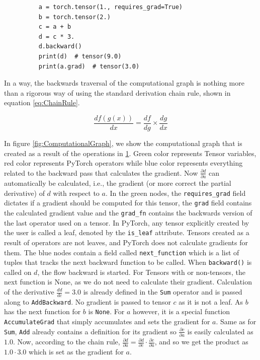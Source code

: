 \begin{figure}[h]
    \centering
    \begin{verbatim}
    a = torch.tensor(1., requires_grad=True)
    b = torch.tensor(2.)
    c = a + b
    d = c * 3.
    d.backward()
    print(d)  # tensor(9.0)
    print(a.grad)  # tensor(3.0)
    \end{verbatim}
    \caption{}
    \label{fig:CodeComputationalGraph}
\end{figure}

In a way, the backwards traversal of the computational graph is nothing more than a rigorous way of using the standard derivation chain rule, shown in equation \ref{eq:ChainRule}.

\begin{equation}\label{eq:ChainRule}
    \frac{d f(g(x))}{dx} = \frac{d f}{dg} \times \frac{d g}{d x}
\end{equation}

In figure \ref{fig:ComputationalGraph}, we show the computational graph that is created as a result of the operations in \ref{fig:CodeComputationalGraph}. Green color represents Tensor variables, red color represents PyTorch operators while blue color represents everything related to the backward pass that calculates the gradient. Now $\frac{\partial d}{\partial a}$ can automatically be calculated, i.e., the gradient (or more correct the partial derivative) of $d$ with respect to $a$. In the green nodes, the \texttt{requires\_grad} field dictates if a gradient should be computed for this tensor, the \texttt{grad} field contains the calculated gradient value and the \texttt{grad\_fn} contains the backwards version of the last operator used on a tensor. In PyTorch, any tensor explicitly created by the user is called a leaf, denoted by the \texttt{is\_leaf} attribute. Tensors created as a result of operators are not leaves, and PyTorch does not calculate gradients for them. The blue nodes contain a field called \texttt{next\_function} which is a list of tuples that tracks the next backward function to be called. When \texttt{backward()} is called on $d$, the flow backward is started. For Tensors with  or non-tensors, the next function is None, as we do not need to calculate their gradient. Calculation of the derivative $\frac{d d}{d c} = 3.0$ is already defined in the \texttt{Sum} operator and is passed along to \texttt{AddBackward}. No gradient is passed to tensor $c$ as it is not a leaf. As $b$ has  the next function for $b$ is \texttt{None}. For $a$ however, it is a special function \texttt{AccumulateGrad} that simply accumulates and sets the gradient for $a$. Same as for \texttt{Sum}, \texttt{Add} already contains a definition for its gradient so $\frac{\partial c}{\partial a}$ is easily calculated as $1.0$. Now, according to the chain rule, $\frac{\partial d}{\partial a} = \frac{\partial d}{\partial c} \cdot \frac{\partial c}{\partial a}$, and so we get the product as $1.0 \cdot 3.0$ which is set as the gradient for $a$.

